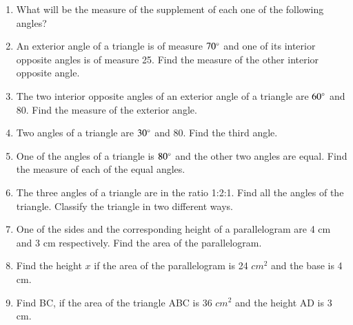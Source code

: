 \begin{enumerate}[label=\thesection.\arabic*, ref=\thesection.\theenumi,resume*]
\begin{enumerate}
\end{enumerate}
\item What will be the measure of the supplement of each one of the following angles? 
		\begin{enumerate}
\end{enumerate}
\item An exterior angle of a triangle is of measure $70\degree$ and one of its interior opposite angles is of measure 25\degree. Find the measure of the other interior opposite angle.
\item The two interior opposite angles of an exterior angle of a triangle are $60\degree$ and 80\degree. Find the measure of the exterior angle.
\item 	Two angles of a triangle are $30\degree$ and 80\degree. Find the third angle. 
\item  One of the angles of a triangle is $80\degree$ and the other two angles are equal. Find the measure of each of the equal angles.
\item  The three angles of a triangle are in the ratio 1:2:1. Find all the angles of the triangle. Classify the triangle in two different ways.
\item One of the sides and the corresponding height of a parallelogram are 4 cm and 3 cm respectively. Find the area of the parallelogram.
\item Find the height $x$ if the area of the parallelogram is 24 $cm^2$ and the base is 4 cm.
\item Find BC, if the area of the triangle ABC is 36 $cm^2$ and the height AD is 3 cm.
		\end{enumerate}
